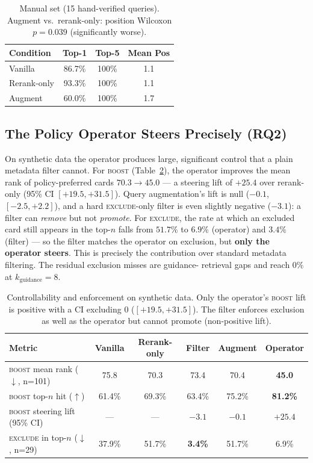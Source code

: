 \documentclass[11pt]{article}
\begin{document}
\begin{table}[h]
\centering
\begin{tabular}{lccc}
\toprule
Condition & Top-1 & Top-5 & Mean Pos \\
\midrule
Vanilla        & 86.7\% & 100\% & 1.1 \\
Rerank-only    & 93.3\% & 100\% & 1.1 \\
Augment        & 60.0\% & 100\% & 1.7 \\
\bottomrule
\end{tabular}
\caption{Manual set (15 hand-verified queries). Augment vs.\ rerank-only: position Wilcoxon
$p{=}0.039$ (significantly worse).}
\label{tab:manual}
\end{table}

\subsection{The Policy Operator Steers Precisely (RQ2)}
On synthetic data the operator produces large, significant control that a plain metadata
filter cannot. For \textsc{boost} (Table~\ref{tab:control}), the operator improves the mean rank
of policy-preferred cards $70.3\!\to\!45.0$ --- a steering lift of $+25.4$ over rerank-only (95\%
CI $[+19.5,+31.5]$). Query augmentation's lift is null ($-0.1$, $[-2.5,+2.2]$), and a hard
\textsc{exclude}-only filter is even slightly negative ($-3.1$): a filter can \emph{remove} but
not \emph{promote}. For \textsc{exclude}, the rate at which an excluded card still appears in the
top-$n$ falls from $51.7\%$ to $6.9\%$ (operator) and $3.4\%$ (filter) --- so the filter matches
the operator on exclusion, but \textbf{only the operator steers}. This is precisely the
contribution over standard metadata filtering. The residual exclusion misses are guidance-
retrieval gaps and reach $0\%$ at $k_{\text{guidance}}{=}8$.

\begin{table}[h]
\centering
\begin{tabular}{lccccc}
\toprule
Metric & Vanilla & Rerank-only & Filter & Augment & Operator \\
\midrule
\textsc{boost} mean rank ($\downarrow$, n=101)   & 75.8 & 70.3 & 73.4 & 70.4 & \textbf{45.0} \\
\textsc{boost} top-$n$ hit ($\uparrow$)          & 61.4\% & 69.3\% & 63.4\% & 75.2\% & \textbf{81.2\%} \\
\textsc{boost} steering lift (95\% CI)           & --- & --- & $-3.1$ & $-0.1$ & \textbf{$+25.4$} \\
\textsc{exclude} in top-$n$ ($\downarrow$, n=29) & 37.9\% & 51.7\% & \textbf{3.4\%} & 51.7\% & 6.9\% \\
\bottomrule
\end{tabular}
\caption{Controllability and enforcement on synthetic data. Only the operator's \textsc{boost}
lift is positive with a CI excluding 0 ($[+19.5,+31.5]$). The filter enforces exclusion as well
as the operator but cannot promote (non-positive lift).}
\label{tab:control}
\end{table}
\end{document}

